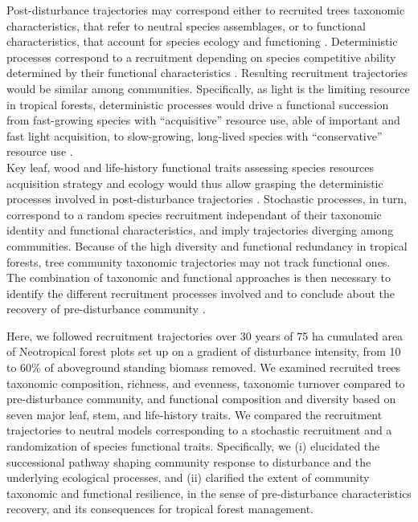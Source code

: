 \documentclass[fleqn,10pt]{ArtEcoFoG} %
\begin{document}
Post-disturbance trajectories may correspond either to recruited trees taxonomic characteristics, that refer to neutral species assemblages, or to functional characteristics, that account for species ecology and functioning \citep{Macarthur1967, Violle2007b, Kunstler2016}.
Deterministic processes correspond to a recruitment depending on species competitive ability determined by their functional characteristics \citep{Rees2001, Perronne2017}.
Resulting recruitment trajectories would be similar among communities.
Specifically, as light is the limiting resource in tropical forests, deterministic processes would drive a functional succession from fast-growing species with ``acquisitive'' resource use, able of important and fast light acquisition, to slow-growing, long-lived species with ``conservative'' resource use \citep{Denslow1980, Molino2001, Bongers2009}.\\
Key leaf, wood and life-history functional traits assessing species resources acquisition strategy and ecology would thus allow grasping the deterministic processes involved in post-disturbance trajectories \citep{Wright2004, Chave2009b, Herault2011}.
Stochastic processes, in turn, correspond to a random species recruitment independant of their taxonomic identity and functional characteristics, and imply trajectories diverging among communities.
Because of the high diversity and functional redundancy in tropical forests, tree community taxonomic trajectories may not track functional ones.
The combination of taxonomic and functional approaches is then necessary to identify the different recruitment processes involved \citep{Fukami2005, Chalmandrier2015, Cequinel2018} and to conclude about the recovery of pre-disturbance community \citep{Clements1916, Diamond1975}.

Here, we followed recruitment trajectories over 30 years of 75 ha cumulated area of Neotropical forest plots set up on a gradient of disturbance intensity, from 10 to 60\% of aboveground standing biomass removed.
We examined recruited trees taxonomic composition, richness, and evenness, taxonomic turnover compared to pre-disturbance community, and functional composition and diversity based on seven major leaf, stem, and life-history traits.
We compared the recruitment trajectories to neutral models corresponding to a stochastic recruitment and a randomization of species functional traits.
Specifically, we (i) elucidated the successional pathway shaping community response to disturbance and the underlying ecological processes, and (ii) clarified the extent of community taxonomic and functional resilience, in the sense of pre-disturbance characteristics recovery, and its consequences for tropical forest management.
\end{document}
